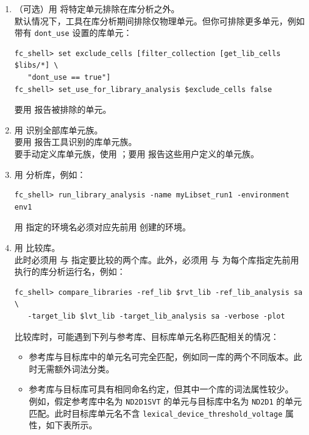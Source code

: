 \begin{enumerate}
  \item （可选）用  将特定单元排除在库分析之外。\\
    默认情况下，工具在库分析期间排除仅物理单元。但你可排除更多单元，例如带有 \texttt{dont\_use} 设置的库单元：
\begin{lstlisting}
fc_shell> set exclude_cells [filter_collection [get_lib_cells $libs/*] \
   "dont_use == true"]
fc_shell> set_use_for_library_analysis $exclude_cells false
\end{lstlisting}
    要用  报告被排除的单元。

  \item 用  识别全部库单元族。\\
    要用  报告工具识别的库单元族。\\
    要手动定义库单元族，使用 \cmd{define\_lib\_cell\_family}；要用  报告这些用户定义的单元族。

  \item 用  分析库，例如：
\begin{lstlisting}
fc_shell> run_library_analysis -name myLibset_run1 -environment env1
\end{lstlisting}
    用  指定的环境名必须对应先前用  创建的环境。

  \item 用  比较库。\\
    此时必须用  与  指定要比较的两个库。此外，必须用  与  为每个库指定先前用  执行的库分析运行名，例如：
\begin{lstlisting}
fc_shell> compare_libraries -ref_lib $rvt_lib -ref_lib_analysis sa \
   -target_lib $lvt_lib -target_lib_analysis sa -verbose -plot
\end{lstlisting}
    比较库时，可能遇到下列与参考库、目标库单元名称匹配相关的情况：
    \begin{itemize}
      \item 参考库与目标库中的单元名可完全匹配，例如同一库的两个不同版本。此时无需额外词法分类。
      \item 参考库与目标库可具有相同命名约定，但其中一个库的词法属性较少。\\
        例如，假定参考库中名为 \texttt{ND2D1SVT} 的单元与目标库中名为 \texttt{ND2D1} 的单元匹配。此时目标库单元名不含 \texttt{lexical\_device\_threshold\_voltage} 属性，如下表所示。


\end{itemize}
\end{enumerate}
